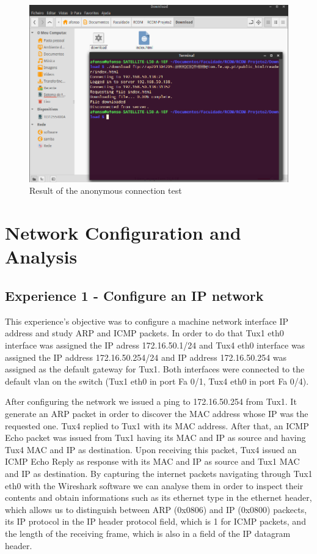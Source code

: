 \documentclass[11pt,a4paper,reqno]{article}
\numberwithin{equation}{section}
\begin{document}
\begin{figure}[p]
\centering
\includegraphics[scale=0.5]{anontest.png}
\caption{Result of the anonymous connection test}
\label{fig:anonconnection}
\end{figure}

\section{Network Configuration and Analysis}

\subsection{Experience 1 - Configure an IP network}

This experience’s objective was to configure a machine network interface IP address and study ARP and ICMP packets. In order to do that Tux1 eth0 interface was assigned the IP adress 172.16.50.1/24 and Tux4 eth0 interface was assigned the IP address 172.16.50.254/24 and IP address 172.16.50.254 was assigned as the default gateway for Tux1. Both interfaces were connected to the default vlan on the switch (Tux1 eth0 in port Fa 0/1, Tux4 eth0 in port Fa 0/4).

After configuring the network we issued a ping to 172.16.50.254 from Tux1. It generate an ARP packet in order to discover the MAC address whose IP was the requested one. Tux4 replied to Tux1 with its MAC address. After that, an ICMP Echo packet was issued from Tux1 having its MAC and IP as source and having Tux4 MAC and IP as destination. Upon receiving this packet, Tux4 issued an ICMP Echo Reply as response with its MAC and IP as source and Tux1 MAC and IP as destination. By capturing the internet packets navigating through Tux1 eth0 with the Wireshark software we can analyse them in order to inspect their contents and obtain informations such as its ethernet type in the ethernet header, which allows us to distinguish between ARP (0x0806) and IP (0x0800) packects, its IP protocol in the IP header protocol field, which is 1 for ICMP packets, and the length of the receiving frame, which is also in a field of the IP datagram header.
\end{document}
